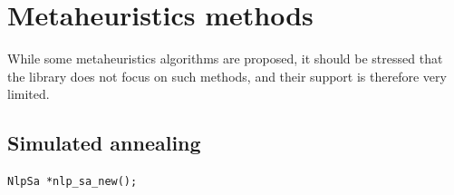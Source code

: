 \chapter{Metaheuristics methods}

While some metaheuristics algorithms are proposed, it should be
stressed that the library does not focus on such methods, and their
support is therefore very limited.

\section{Simulated annealing}

\begin{verbatim}
NlpSa *nlp_sa_new();
\end{verbatim}
